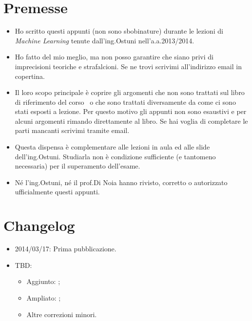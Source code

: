 \section*{Premesse}
\begin{itemize}
\item Ho scritto questi appunti (non sono sbobinature) durante le lezioni di \emph{Machine Learning }tenute dall'ing.\@ Ostuni nell'a.a.\@ 2013/2014. 

\item Ho fatto del mio meglio, ma non posso garantire che siano privi di imprecisioni teoriche e strafalcioni. Se ne trovi scrivimi all'indirizzo email in copertina.

\item Il loro scopo principale è coprire gli argomenti che non sono trattati sul libro di riferimento del corso~\cite{AIMA} o che sono trattati diversamente da come ci sono stati esposti a lezione. Per questo motivo gli appunti non sono esaustivi e per alcuni argomenti rimando direttamente al libro. Se hai voglia di completare le parti mancanti scrivimi tramite email.

\item Questa dispensa è complementare alle lezioni in aula ed alle slide dell'ing.\@  Ostuni. Studiarla non è condizione sufficiente (e tantomeno necessaria) per il superamento dell'esame.

\item Né l'ing.\@  Ostuni, né il prof.\@  Di Noia hanno rivisto, corretto o autorizzato ufficialmente questi appunti.
\end{itemize}

\section*{Changelog}

\begin{itemize}
    \item 2014/03/17: Prima pubblicazione.
    
    \item TBD: \begin{itemize}
        \item Aggiunto: ;
        \item Ampliato: ;
        \item Altre correzioni minori.
     \end{itemize}
\end{itemize}

